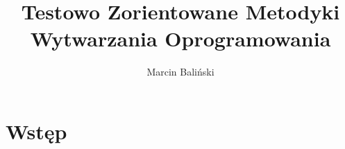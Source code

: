 \documentclass[a4paper,12pt]{report}
\author{Marcin Baliński}
\title{Testowo Zorientowane Metodyki Wytwarzania Oprogramowania}
\begin{document}
	\maketitle
	\tableofcontents
	\section{Wstęp}
\end{document}
